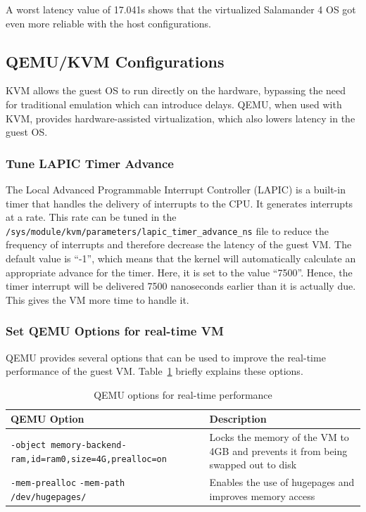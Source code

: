 \documentclass[MMR,Master,english]{twbook}
\begin{document}
\noindent A worst latency value of 17.041\textmu s shows that the virtualized Salamander 4 OS got even more reliable with the host configurations. 


\clearpage
\subsection{QEMU/KVM Configurations}\label{subsec:guest_configurations}
KVM allows the guest OS to run directly on the hardware, bypassing the need for traditional emulation which can introduce delays. QEMU, when used with KVM, provides hardware-assisted virtualization, which also lowers latency in the guest OS.

\subsubsection{Tune LAPIC Timer Advance}
The Local Advanced Programmable Interrupt Controller (LAPIC) is a built-in timer that handles the delivery of interrupts to the CPU.
It generates interrupts at a rate. This rate can be tuned in the \texttt{/sys/module/kvm/parameters/lapic\_timer\_advance\_ns} file to reduce the frequency of interrupts and therefore decrease the latency of the guest VM. The default value is ``-1'', which means that the kernel will automatically calculate an appropriate advance for the timer. Here, it is set to the value ``7500''. Hence, the timer interrupt will be delivered 7500 nanoseconds earlier than it is actually due. This gives the VM more time to handle it.

\subsubsection{Set QEMU Options for real-time VM}
QEMU provides several options that can be used to improve the real-time performance of the guest VM. Table~\ref{tab:qemu_options} briefly explains these options.

\begin{table}[H]
	\centering
	\caption{QEMU options for real-time performance}
	\label{tab:qemu_options}
	\setlength{\tabcolsep}{0.5em} %
	{\renewcommand{\arraystretch}{1.2}%
		\begin{tabular}{|p{6.5cm}|p{8cm}|}
			\hline
			\textbf{QEMU Option}                                                             & \textbf{Description}                                                             \\\hline
			\texttt{-object memory-backend-ram,}\newline\texttt{id=ram0,size=4G,prealloc=on} & Locks the memory of the VM to 4GB and prevents it from being swapped out to disk \\\hline
			\texttt{-mem-prealloc} \newline \texttt{-mem-path /dev/hugepages/}               & Enables the use of hugepages and improves \newline memory access                 \\\hline
		\end{tabular}}
\end{table}
\end{document}
